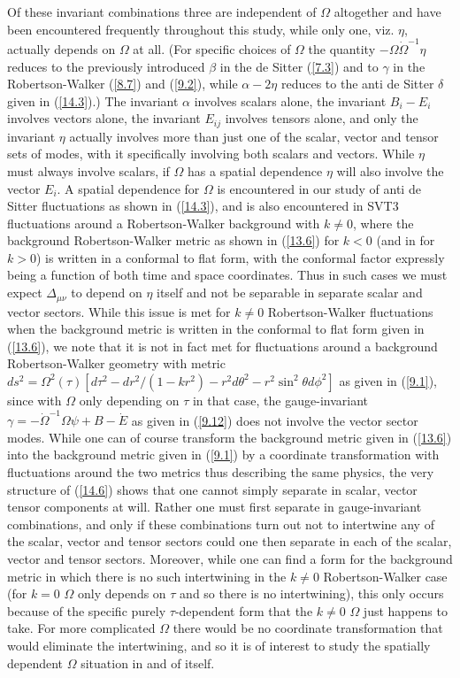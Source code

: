 \documentclass[aps,onecolumn,10pt]{revtex4}
\numberwithin{equation}{section}
\numberwithin{equation}{section}
\begin{document}
Of these invariant combinations three are independent of $\Omega$ altogether and have been encountered frequently throughout this study, while only one, viz. $\eta$, actually depends on $\Omega$ at all. (For specific choices of $\Omega$ the quantity $-\Omega\dot{\Omega}^{-1}\eta$ reduces to the previously introduced $\beta$ in the de Sitter (\ref{7.3}) and to $\gamma$ in the Robertson-Walker (\ref{8.7}) and (\ref{9.2}), while $\alpha-2\eta$ reduces to the anti de Sitter $\delta$ given in (\ref{14.3}).) The invariant $\alpha$ involves scalars alone, the invariant $B_i-E_i$ involves vectors alone, the invariant $E_{ij}$  involves tensors alone, and only the invariant $\eta$ actually involves more than just one of the scalar, vector and tensor sets of modes, with it specifically involving both scalars and vectors. While $\eta$ must always involve scalars, if $\Omega$ has a spatial dependence $\eta$ will also involve the vector $E_i$. A spatial dependence for $\Omega$ is  encountered in our study of anti de Sitter fluctuations as shown in (\ref{14.3}), and is also encountered in SVT3 fluctuations around a Robertson-Walker background with $k\neq 0$,  where the background Robertson-Walker metric as shown in (\ref{13.6}) for $k<0$ (and in \cite{Amarasinghe2018} for $k>0$) is written in a conformal to flat form, with the conformal factor expressly being a function of both time and space coordinates. Thus in such cases we must expect $\Delta_{\mu\nu}$ to depend on $\eta$ itself and not be separable in separate scalar and vector sectors. While this issue is met for $k\neq 0$ Robertson-Walker fluctuations when the background metric is written in the conformal to flat form given in (\ref{13.6}), we note that it is not in fact met for fluctuations around a background Robertson-Walker geometry with metric $ds^2=\Omega^2(\tau)[d\tau^2-dr^2/(1-kr^2)-r^2d\theta^2-r^2\sin^2\theta d\phi^2]$ as given in (\ref{9.1}), since with $\Omega$ only depending on $\tau$ in that case, the gauge-invariant $\gamma = - \dot\Omega^{-1}\Omega \psi + B - \dot E$ as given in (\ref{9.12}) does not involve the vector sector modes. While one can of course transform the background metric given in (\ref{13.6}) into the background metric given in (\ref{9.1}) by a coordinate transformation with fluctuations around the two metrics thus describing the same physics, the very structure of (\ref{14.6}) shows that one cannot simply separate in scalar, vector tensor components at will. Rather one must first separate in gauge-invariant combinations, and only if these combinations turn out not to intertwine any of the scalar, vector and tensor sectors could one then separate in each of the scalar, vector and tensor sectors. Moreover, while one can find a form for the background metric in which there is no such intertwining in the $k\neq 0$ Robertson-Walker case (for $k=0$ $\Omega$ only depends on $\tau$ and so there is no intertwining), this only occurs because of the specific purely $\tau$-dependent form that  the $k\neq 0$ $\Omega$ just happens to take.  For more complicated $\Omega$ there would be no coordinate transformation that would eliminate the intertwining, and so it is of interest to study the spatially dependent $\Omega$ situation in and of itself.
\end{document}
